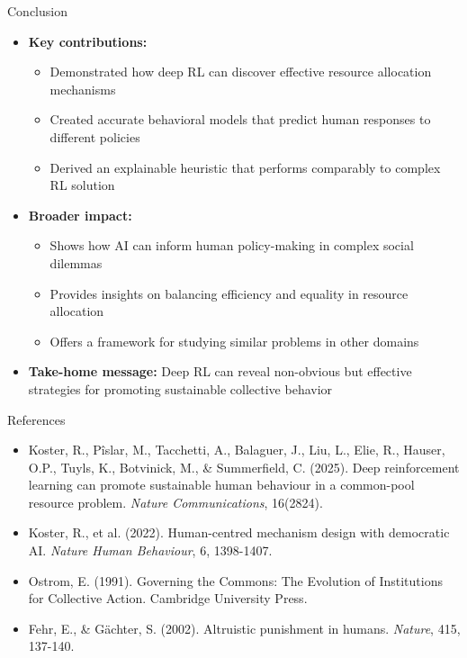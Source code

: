 \documentclass[aspectratio=169]{beamer} %
\begin{document}
\begin{frame}{Conclusion}
\begin{itemize}
    \item \textbf{Key contributions:}
    \begin{itemize}
        \item Demonstrated how deep RL can discover effective resource allocation mechanisms
        \item Created accurate behavioral models that predict human responses to different policies
        \item Derived an explainable heuristic that performs comparably to complex RL solution
    \end{itemize}
    
    \item \textbf{Broader impact:}
    \begin{itemize}
        \item Shows how AI can inform human policy-making in complex social dilemmas
        \item Provides insights on balancing efficiency and equality in resource allocation
        \item Offers a framework for studying similar problems in other domains
    \end{itemize}
    
    \item \textbf{Take-home message:} Deep RL can reveal non-obvious but effective strategies for promoting sustainable collective behavior
\end{itemize}
\end{frame}

\begin{frame}{References}
\begin{itemize}
    \item Koster, R., Pîslar, M., Tacchetti, A., Balaguer, J., Liu, L., Elie, R., Hauser, O.P., Tuyls, K., Botvinick, M., \& Summerfield, C. (2025). Deep reinforcement learning can promote sustainable human behaviour in a common-pool resource problem. \textit{Nature Communications}, 16(2824).
    
    \item Koster, R., et al. (2022). Human-centred mechanism design with democratic AI. \textit{Nature Human Behaviour}, 6, 1398-1407.
    
    \item Ostrom, E. (1991). Governing the Commons: The Evolution of Institutions for Collective Action. Cambridge University Press.
    
    \item Fehr, E., \& Gächter, S. (2002). Altruistic punishment in humans. \textit{Nature}, 415, 137-140.
\end{itemize}
\end{frame}
\end{document}
